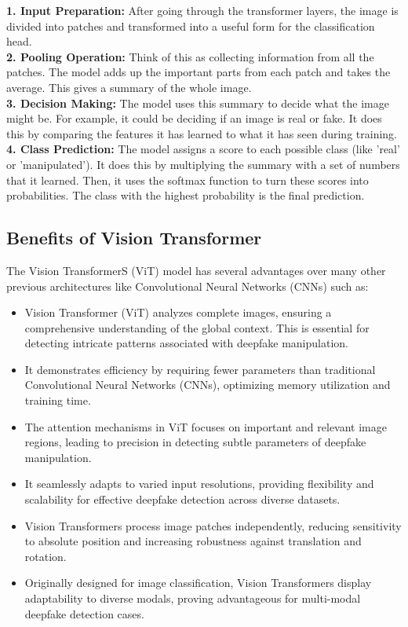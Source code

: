\noindent \textbf{1. Input Preparation:} After going through the transformer layers, the image is divided into patches and transformed into a useful form for the classification head.
\\

\noindent \textbf{2. Pooling Operation:} Think of this as collecting information from all the patches. The model adds up the important parts from each patch and takes the average. This gives a summary of the whole image.
\\

\noindent \textbf{3. Decision Making:} The model uses this summary to decide what the image might be. For example, it could be deciding if an image is real or fake. It does this by comparing the features it has learned to what it has seen during training.
\\

\noindent \textbf{4. Class Prediction:} The model assigns a score to each possible class (like 'real' or 'manipulated'). It does this by multiplying the summary with a set of numbers that it learned. Then, it uses the softmax function to turn these scores into probabilities. The class with the highest probability is the final prediction.

\subsection{Benefits of Vision Transformer}

The Vision TransformerS (ViT) model has several advantages over many other previous architectures like Convolutional Neural Networks (CNNs) such as:

\begin{itemize}
    \item
          Vision Transformer (ViT) analyzes complete images, ensuring a comprehensive understanding of the global context. This is essential for detecting intricate patterns associated with deepfake manipulation.

    \item It demonstrates efficiency by requiring fewer parameters than traditional Convolutional Neural Networks (CNNs), optimizing memory utilization and training time.

    \item The attention mechanisms in ViT focuses on important and relevant image regions, leading to precision in detecting subtle parameters of deepfake manipulation.

    \item It seamlessly adapts to varied input resolutions, providing flexibility and scalability for effective deepfake detection across diverse datasets.

    \item Vision Transformers process image patches independently, reducing sensitivity to absolute position and increasing robustness against translation and rotation.

    \item Originally designed for image classification, Vision Transformers display adaptability to diverse modals, proving advantageous for multi-modal deepfake detection cases.

\end{itemize}
\newpage
